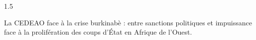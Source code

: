 \documentclass[12pt]{article}
\begin{document}
\begin{spacing}{1.5}

La CEDEAO face à la crise burkinabè : entre sanctions politiques et impuissance face à la prolifération des coups d'État en Afrique de l'Ouest.




\quad
\quad

\end{spacing}
\end{document}
